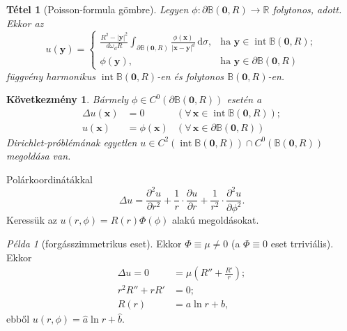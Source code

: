 \documentclass[DIV=15,appendixprefix]{scrreprt}
\newtheorem*{tetel}{Tétel}
\newtheorem*{kovet}{Következmény}
\theoremstyle{definition}
\theoremstyle{remark}
\newtheorem*{pelda}{Példa}
\newcommand{\ball}{\mathbb{B}}
\DeclareMathOperator{\interior}{int}
\newcommand{\ballin}{\interior\mathbb{B}}
\begin{document}
\begin{tetel}[Poisson-formula gömbre]
	Legyen $ \phi \colon \partial \ball \left( \mathbf{ 0 },{} R \right) \rightarrow \mathbb{ R } $
	folytonos, adott. Ekkor az
	\begin{equation*}
		u \left( \mathbf{ y } \right) = \begin{cases}
			\frac{ R^{ 2 } - \left| \mathbf{ y } \right|^{ 2 } }{ d
				\omega_{ d } R } \int_{ \partial \ball \left( \mathbf{ 0 },{} R \right) } \frac{
				\phi \left( \mathbf{ x } \right)}{ \left| \mathbf{ x } - \mathbf{ y } \right|^{ d }
				} \, \mathrm{ d }\sigma, & \text{ha } \mathbf{ y } \in \ballin \left( \mathbf{ 0
				},{} R
				\right);\\
			\phi \left( \mathbf{ y } \right), & \text{ha } \mathbf{ y } \in \partial \ball \left(
				\mathbf{ 0 },{} R \right)
		\end{cases}
	\end{equation*}
	függvény harmonikus $ \ballin \left( \mathbf{ 0 },{} R \right) $-en és folytonos $ \ball \left(
	\mathbf{ 0 },{} R \right) $-en.
\end{tetel}
%
\begin{kovet}
Bármely $ \phi \in C^{ 0 } \left( \partial \ball \left( \mathbf{ 0 },{} R \right) \right) $ esetén
a
\begin{align*}
	\Delta u \left( \mathbf{ x } \right) &= 0 & \left( \forall \, \mathbf{ x } \in \ballin \left(
		\mathbf{ 0 },{} R \right) \right);\\
	u \left( \mathbf{ x } \right) &= \phi \left( \mathbf{ x } \right) & \left( \forall \,
		\mathbf{ x } \in \partial \ball \left( \mathbf{ 0 },{} R \right) \right)
\end{align*}
Dirichlet-próblémának egyetlen $ u \in C^{ 2 } \left( \ballin \left( \mathbf{ 0 },{} R \right)
\right) \cap C^{ 0 } \left( \ball \left( \mathbf{ 0 },{} R \right) \right) $ megoldása van.
\end{kovet}
%
Polárkoordinátákkal
\begin{equation*}
	\Delta u = \frac{ \partial^{ 2 } u }{ \partial r^{ 2 } } + \frac{ 1 }{ r } \cdot \frac{ \partial
	u }{ \partial r } + \frac{ 1 }{ r^{ 2 } } \cdot \frac{ \partial^{ 2 } u }{ \partial \phi^{ 2 }
	}.
\end{equation*}
Keressük az $ u \left( r,{} \phi \right) = R \left( r \right) \Phi \left( \phi
\right) $ alakú megoldásokat.
\begin{pelda}[forgásszimmetrikus eset]
	Ekkor $ \Phi \equiv \mu \neq 0 $ (a $ \Phi \equiv 0 $ eset trriviális). Ekkor
	\begin{align*}
		\Delta u = 0 &= \mu \left( R'' + \frac{ R' }{ r } \right);\\
		r^{ 2 } R'' + r R' &= 0;\\
		R \left( r \right) &= a \ln r + b,
	\end{align*}
	ebből $ u \left( r,{} \phi \right) = \hat{ a } \ln r + \hat{ b } $.
\end{pelda}
%
\end{document}
